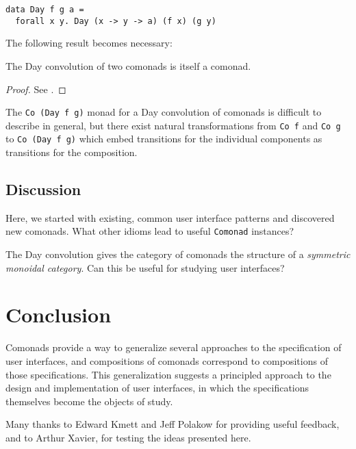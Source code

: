 \documentclass[nocopyrightspace]{sigplanconf}
\begin{document}
\begin{verbatim}
data Day f g a =
  forall x y. Day (x -> y -> a) (f x) (g y)
\end{verbatim}

The following result becomes necessary:

\begin{theorem}
The Day convolution of two comonads is itself a comonad.
\end{theorem}

\begin{proof}
See \citet{freeman1}.
\end{proof}

The \texttt{Co (Day f g)} monad for a Day convolution of comonads is difficult to
describe in general, but there exist natural transformations from \texttt{Co f}
and \texttt{Co g} to \texttt{Co (Day f g)} which embed transitions
for the individual components as transitions for the composition.

\subsection{Discussion}

Here, we started with existing, common user interface patterns and discovered
new comonads. What other idioms lead to useful \texttt{Comonad} instances?

The Day convolution gives the category of comonads the structure of a
\textit{symmetric monoidal category}. Can this be useful for studying user interfaces?

\section{Conclusion}

Comonads provide a way to generalize several approaches to the specification of
user interfaces, and compositions of comonads correspond to compositions
of those specifications.
This generalization suggests a principled approach to the design and
implementation of user interfaces, in which the specifications themselves become the objects
of study.

\acks

Many thanks to Edward Kmett and Jeff Polakow for providing useful feedback, and to
Arthur Xavier, for testing the ideas presented here.


\end{document}
